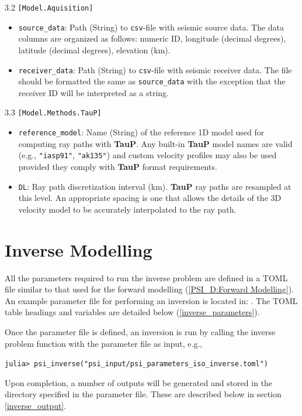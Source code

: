 3.2 \texttt{[Model.Aquisition]}
\begin{itemize}
\item \texttt{source\_data}: Path (String) to \texttt{csv}-file with seismic source data. The data columns are organized as follows: numeric ID, longitude (decimal degrees), latitude (decimal degrees), elevation (km).
\item \texttt{receiver\_data}: Path (String) to \texttt{csv}-file with seismic receiver data. The file should be formatted the same as \texttt{source\_data} with the exception that the receiver ID will be interpreted as a string.
\end{itemize}

3.3 \texttt{[Model.Methods.TauP]}
\begin{itemize}
\item \texttt{reference\_model}: Name (String) of the reference 1D model used for computing ray paths with \textbf{TauP}. Any built-in \textbf{TauP} model names are valid (e.g., \texttt{"iasp91"}, \texttt{"ak135"}) and custom velocity profiles may also be used provided they comply with \textbf{TauP} format requirements.
\item \texttt{DL}: Ray path discretization interval (km). \textbf{TauP} ray paths are resampled at this level. An appropriate spacing is one that allows the details of the 3D velocity model to be accurately interpolated to the ray path.
\end{itemize}

\section{Inverse Modelling} \label{PSI_D:Inverse Modelling}

All the parameters required to run the inverse problem are defined in a TOML file similar to that used for the forward modelling (\ref{PSI_D:Forward Modelling}). An example parameter file for performing an inversion is located in: . The TOML table headings and variables are detailed below (\ref{inverse_parameters}).

Once the parameter file is defined, an inversion is run by calling the inverse problem function with the parameter file as input, e.g.,

\texttt{julia> psi\_inverse("psi\_input/psi\_parameters\_iso\_inverse.toml")}

Upon completion, a number of outputs will be generated and stored in the directory specified in the parameter file. These are described below in section \ref{inverse_output}.

